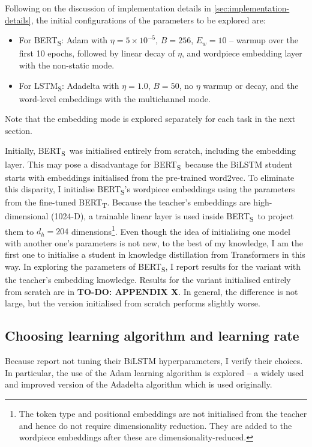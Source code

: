 \documentclass[bsc,frontabs,twoside,singlespacing,parskip,deptreport]{infthesis}
\def\BERTT{BERT\textsubscript{T}}
\def\BERTS{BERT\textsubscript{S}}
\def\LSTMS{LSTM\textsubscript{S}}
\begin{document}
{{      %
    Following on the discussion of implementation details in \autoref{sec:implementation-details}, the initial configurations of the parameters to be explored are:
    \begin{itemize}
      \item For \BERTS: Adam with $\eta=5\times10^{-5}$, $B=256$, $E_{w}=10$ -- warmup over the first 10 epochs, followed by linear decay of $\eta$, and wordpiece embedding layer with the non-static mode.
      \item For \LSTMS: Adadelta with $\eta=1.0$, $B=50$, no $\eta$ warmup or decay, and the word-level embeddings with the multichannel mode.
    \end{itemize}
    Note that the embedding mode is explored separately for each task in the next section.

    Initially, \BERTS~was initialised entirely from scratch, including the embedding layer. 
    This may pose a disadvantage for \BERTS~because the BiLSTM student starts with embeddings initialised from the pre-trained word2vec. To eliminate this disparity, I initialise \BERTS's wordpiece embeddings using the parameters from the fine-tuned \BERTT. 
    Because the teacher's embeddings are high-dimensional (1024-D), a trainable linear layer is used inside \BERTS~to project them to $d_h=204$ dimensions\footnote{The token type and positional embeddings are not initialised from the teacher and hence do not require dimensionality reduction. They are added to the wordpiece embeddings after these are dimensionality-reduced.}.
    Even though the idea of initialising one model with another one's parameters is not new, to the best of my knowledge, I am the first one to initialise a student in knowledge distillation from Transformers in this way.
    In exploring the parameters of \BERTS, I report results for the variant with the teacher's embedding knowledge. Results for the variant initialised entirely from scratch are in \textbf{TO-DO: APPENDIX X}.
    In general, the difference is not large, but the version initialised from scratch performs slightly worse.
    
    \subsection{Choosing learning algorithm and learning rate}{
      Because \citet{Tang_2019b} report not tuning their BiLSTM hyperparameters, I verify their choices.
      In particular, the use of the Adam learning algorithm is explored -- a widely used and improved version of the Adadelta algorithm which is used originally.

}}}
\end{document}

